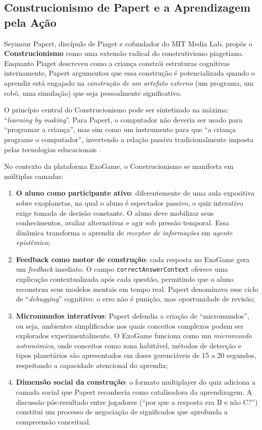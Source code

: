 \documentclass[
	12pt,
	openany,
	oneside,
	a4paper,
	english,
	brazil
]{abntex2}
\begin{document}
\subsection{Construcionismo de Papert e a Aprendizagem pela Ação}
 
Seymour Papert, discípulo de Piaget e cofundador do MIT Media Lab, propôs o \textbf{Construcionismo} como uma extensão radical do construtivismo piagetiano. Enquanto Piaget descreveu como a criança constrói estruturas cognitivas internamente, Papert \cite{papert1985, papert1994} argumentou que essa construção é potencializada quando o aprendiz está engajado na \textit{construção de um artefato externo} (um programa, um robô, uma simulação) que seja pessoalmente significativo.
 
O princípio central do Construcionismo pode ser sintetizado na máxima: ``\textit{learning by making}''. Para Papert, o computador não deveria ser usado para ``programar a criança'', mas sim como um instrumento para que ``a criança programe o computador'', invertendo a relação passiva tradicionalmente imposta pelas tecnologias educacionais \cite{papert1985}.
 
No contexto da plataforma ExoGame, o Construcionismo se manifesta em múltiplas camadas:
 
\begin{enumerate}
  \item \textbf{O aluno como participante ativo}: diferentemente de uma aula expositiva sobre exoplanetas, na qual o aluno é espectador passivo, o quiz interativo exige tomada de decisão constante. O aluno deve mobilizar seus conhecimentos, avaliar alternativas e agir sob pressão temporal. Essa dinâmica transforma o aprendiz de \textit{receptor de informações} em \textit{agente epistêmico};
 
  \item \textbf{Feedback como motor de construção}: cada resposta no ExoGame gera um \textit{feedback} imediato. O campo \texttt{correctAnswerContext} oferece uma explicação contextualizada após cada questão, permitindo que o aluno reconstrua seus modelos mentais em tempo real. Papert \cite{papert1993} denominava esse ciclo de ``\textit{debugging}'' cognitivo: o erro não é punição, mas oportunidade de revisão;
 
  \item \textbf{Micromundos interativos}: Papert defendia a criação de ``micromundos'', ou seja, ambientes simplificados nos quais conceitos complexos podem ser explorados experimentalmente. O ExoGame funciona como um \textit{micromundo astronômico}, onde conceitos como zona habitável, métodos de detecção e tipos planetários são apresentados em doses gerenciáveis de 15 a 20 segundos, respeitando a capacidade atencional do aprendiz;
 
  \item \textbf{Dimensão social da construção}: o formato multiplayer do quiz adiciona a camada social que Papert reconhecia como catalisadora da aprendizagem. A discussão pós-resultado entre jogadores (``por que a resposta era B e não C?'') constitui um processo de negociação de significados que aprofunda a compreensão conceitual.
\end{enumerate}
 
\end{document}

